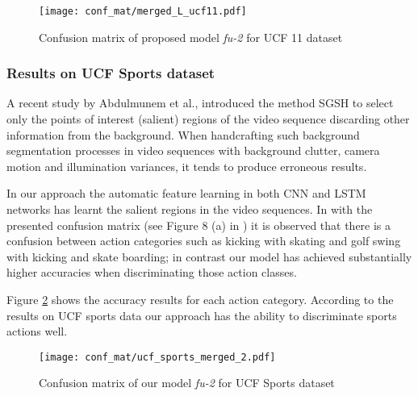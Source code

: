 \documentclass[10pt,twocolumn,letterpaper]{article}
\begin{document}
 \begin{figure}[h]
        \begin{flushleft}
        	\texttt{[image: conf\_mat/merged\_L\_ucf11.pdf]}
	\vspace{-2 mm}
	\caption{Confusion matrix of proposed model \textit{fu-2} for UCF 11 dataset}
	\label{fig:fig5}
        \end{flushleft}
        \vspace{-3 mm}
  \end{figure}
 \vspace{-7 mm}
 
 \subsubsection{Results on UCF Sports dataset}
 
  
  A recent study by Abdulmunem et al.\cite{Abdulmunem2016}, introduced the method SGSH to select only the points of interest (salient) regions of the video sequence discarding other information from the background. When handcrafting such background segmentation processes in video sequences with background clutter, camera motion and illumination variances, it tends to produce erroneous results. 
  
  In our approach the automatic feature learning in both CNN and LSTM networks has learnt the salient regions in the video sequences. In \cite{Abdulmunem2016} with the presented confusion matrix (see Figure 8 (a) in \cite{Abdulmunem2016}) it is observed that there is a confusion between action categories such as kicking with skating and golf swing with kicking and skate boarding; in contrast our model has achieved substantially higher accuracies when discriminating those action classes. 
  
  Figure \ref{fig:fig6} shows the accuracy results for each action category. According to the results on UCF sports data our approach has the ability to discriminate sports actions well.
  
   \begin{figure}[!h]
   \vspace{-3 mm}
        \begin{flushleft}
        	\texttt{[image: conf\_mat/ucf\_sports\_merged\_2.pdf]}
	\vspace{-4 mm}
	\caption{Confusion matrix of our model \textit{fu-2} for UCF Sports dataset}
	\label{fig:fig6}
        \end{flushleft}
        \vspace{-1 mm}
  \end{figure}
\end{document}

